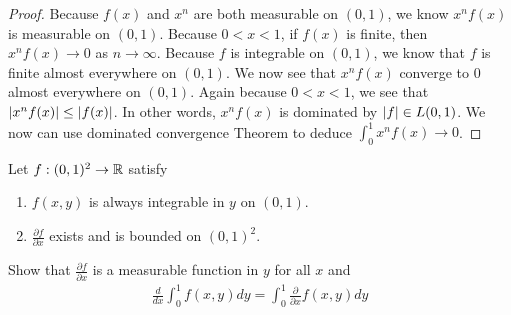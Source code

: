 \documentclass{report}
\begin{document}
\begin{proof}
  Because $f(x)$ and $x^n$ are both measurable on  $(0,1)$, we know $x^nf(x)$ is measurable on $(0,1)$. Because $0<x<1$, if $f(x)$ is finite, then $x^nf(x)\to 0$ as $n \to \infty$. Because $f$ is integrable on $(0,1)$, we know that $f$ is finite almost everywhere on $(0,1)$. We now see that $x^nf(x)$ converge to $0$ almost everywhere on  $(0,1)$. Again because $0<x<1$, we see that $\left|x^nf(x)\right|\leq \left|f(x)\right|$. In other words, $x^nf(x)$ is dominated by $\left|f\right|\in L(0,1)$. We now can use dominated convergence Theorem to deduce $\int_0^1 x^nf(x)\to 0$.  
\end{proof}
\begin{question}{}{}
Let  $f:(0,1)^2 \rightarrow \mathbb{R}$ satisfy 
\begin{enumerate}[label=(\alph*)]
  \item $f(x,y)$ is always integrable in $y$ on  $(0,1)$. 
  \item $\frac{\partial f}{\partial x}$ exists and is bounded on $(0,1)^2$. 
\end{enumerate}
Show that $\frac{\partial f}{\partial x}$ is a measurable function in $y$ for all  $x$ and 
 \begin{align*}
\frac{d}{dx}\int_0^1 f(x,y)dy=\int_0^1 \frac{\partial }{\partial x}f(x,y)dy
\end{align*}
\end{question}
\end{document}
